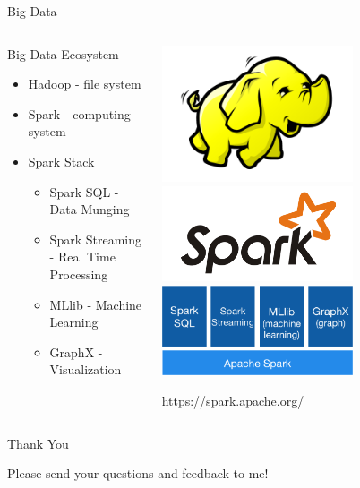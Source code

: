 \documentclass[10pt]{beamer}
\begin{document}
    \begin{frame}{Big Data}
      \begin{columns}
        \begin{column}[T]{0.48\textwidth}
          \begin{block}{Big Data Ecosystem}
            \begin{itemize}
              \item<1-> Hadoop - file system
              \item<2-> Spark - computing system
              \item<3-> Spark Stack
                \begin{itemize}
                  \item<4-> Spark SQL - Data Munging
                  \item<4-> Spark Streaming - Real Time Processing
                  \item<4-> MLlib - Machine Learning
                  \item<4-> GraphX - Visualization
                \end{itemize}
            \end{itemize}
          \end{block}
        \end{column}
        \begin{column}[T]{0.48\textwidth}
          \begin{overprint}
            \includegraphics[width=160pt]{../graphs/logo/hadoop}
            \includegraphics[width=160pt]{../graphs/logo/spark}
            \includegraphics[width=160pt]{../graphs/logo/spark-stack}
            
            {\footnotesize \url{https://spark.apache.org/}}
          \end{overprint}
        \end{column}   
      \end{columns}
    \end{frame}

    \begin{frame}{Thank You}
      \centerline{\large Please send your questions and feedback to me!}
    \end{frame}
\end{document}
